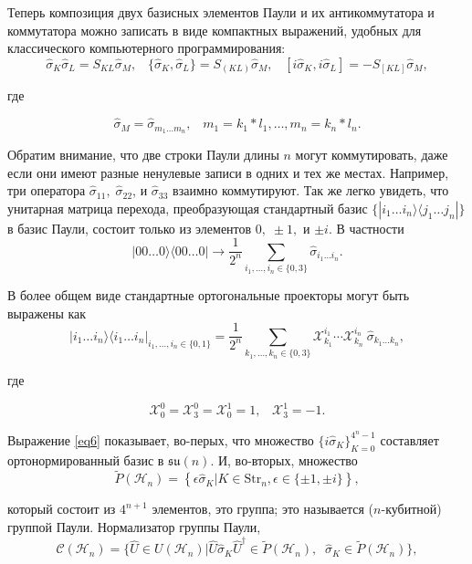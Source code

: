 \documentclass[a4paper]{report}
\begin{document}
Теперь композиция двух базисных элементов Паули и их антикоммутатора и коммутатора можно записать в виде компактных выражений, удобных для классического компьютерного программирования:
\begin{equation}\tag{6}\label{eq6}
    \hat{\sigma}_K\hat{\sigma}_L=S_{KL}\hat{\sigma}_M,\;\;\;\{\hat{\sigma}_K,\hat{\sigma}_L\}=S_{(KL)}\hat{\sigma}_M,\;\;\;[i\hat{\sigma}_K, i\hat{\sigma}_L]=-S_{[KL]}\hat{\sigma}_M,
\end{equation}

\noindent где

\begin{equation}\tag{7}\label{eq7}
    \hat{\sigma}_M=\hat{\sigma}_{m_1\ldots m_n}, \;\;\; m_1 = k_1*l_1,\ldots,m_n=k_n*l_n.
\end{equation}

Обратим внимание, что две строки Паули длины ${n}$ могут коммутировать, даже если они имеют разные ненулевые записи в одних и тех же местах. Например, три оператора ${\hat{\sigma}_{11},\;\hat{\sigma}_{22}}$, и ${\hat{\sigma}_{33}}$ взаимно коммутируют. Так же легко увидеть, что унитарная матрица перехода, преобразующая стандартный базис ${\{|i_1\ldots i_n\rangle\langle j_1\ldots j_n|\}}$ в базис Паули, состоит только из элементов ${0,\;\pm1,}$ и ${\pm i}$. В частности
$${|00\ldots0\rangle\langle00\ldots0|\rightarrow\frac{1}{2^n}\sum_{i_1,\ldots,i_n\in\{0,3\}}\hat{\sigma}_{i_1\ldots i_n}.}$$

В более общем виде стандартные ортогональные проекторы могут быть выражены как
$${
    |i_1\ldots i_n\rangle\langle i_1\ldots i_n|_{i_1,\ldots,i_n\in\{0,1\}} = \frac{1}{2^n}\sum_{k_1,\ldots,k_n\in\{0,3\}}\mathcal{X}^{i_1}_{k_1}\cdots\mathcal{X}^{i_n}_{k_n}\:\hat{\sigma}_{k_1\ldots k_n},
    }$$

\noindent где

$${
            \mathcal{X}^0_0=\mathcal{X}^0_3=\mathcal{X}^1_0=1,\;\;\;\mathcal{X}^1_3 = -1.
        }$$

Выражение \eqref{eq6} показывает, во-перых, что множество ${\{i\hat{\sigma}_K\}^{4^n-1}_{K=0}}$ составляет ортонормированный базис в ${\mathfrak{su}(n)}$. И, во-вторых, множество
$${
            \widetilde{P}(\mathcal{H}_n) = \left\{\epsilon\hat{\sigma}_K|K\in\mathrm{Str}_n,\epsilon\in\{\pm1,\pm i\}\right\},
        }$$

\noindent который состоит из ${4^{n+1}}$ элементов, это группа; это называется \mbox{(${n}$-кубитной)} группой Паули. Нормализатор группы Паули,
$${
            \mathcal{C}(\mathcal{H}_n)=\{\hat{U}\in U(\mathcal{H}_n)|\hat{U}\hat{\sigma}_K\hat{U}^\dagger\in\widetilde{P}(\mathcal{H}_n),\;\;\hat{\sigma}_K\in\widetilde{P}(\mathcal{H}_n)\},
        }$$
\end{document}
